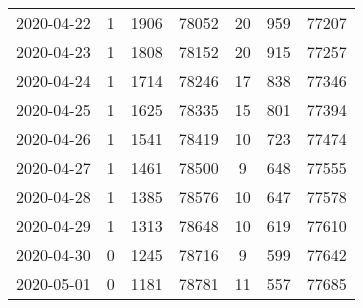 \begin{longtable}{ccccccc}
2020-04-22&1&1906&78052&20&959&77207\\
2020-04-23&1&1808&78152&20&915&77257\\
2020-04-24&1&1714&78246&17&838&77346\\
2020-04-25&1&1625&78335&15&801&77394\\
2020-04-26&1&1541&78419&10&723&77474\\
2020-04-27&1&1461&78500&9&648&77555\\
2020-04-28&1&1385&78576&10&647&77578\\
2020-04-29&1&1313&78648&10&619&77610\\
2020-04-30&0&1245&78716&9&599&77642\\
2020-05-01&0&1181&78781&11&557&77685\\
\hline
\end{longtable}
